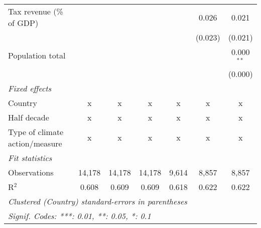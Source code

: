 \begin{tabular}{lcccccc}
   Tax revenue (\% of GDP)                &         &                &                &                & 0.026          & 0.021\\   
                                          &         &                &                &                & (0.023)        & (0.021)\\   
   Population total                       &         &                &                &                &                & 0.000$^{**}$\\   
                                          &         &                &                &                &                & (0.000)\\   
   \emph{Fixed effects}\\
   Country                                & x       & x              & x              & x              & x              & x\\  
   Half decade                            & x       & x              & x              & x              & x              & x\\  
   Type of climate action/measure         & x       & x              & x              & x              & x              & x\\  
   \midrule \emph{Fit statistics}\\
   Observations                           & 14,178  & 14,178         & 14,178         & 9,614          & 8,857          & 8,857\\  
   R$^2$                                  & 0.608   & 0.609          & 0.609          & 0.618          & 0.622          & 0.622\\  
   \midrule
   \multicolumn{7}{l}{\emph{Clustered (Country) standard-errors in parentheses}}\\
   \multicolumn{7}{l}{\emph{Signif. Codes: ***: 0.01, **: 0.05, *: 0.1}}\\
\end{tabular}
\par\endgroup


